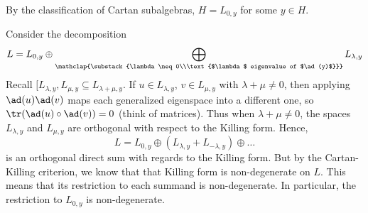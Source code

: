 By the classification of Cartan subalgebras, $H = L_{0, y}$ for some
$y \in H$.

Consider the decomposition
\[ L = L_{0, y} \oplus \bigoplus_{\mathclap{\substack{\lambda\neq 0\\\text{$\lambda$ eigenvalue of $\ad(y)$}}}} L_{\lambda, y} \]
Recall $[L_{\lambda, y}, L_{\mu, y} \subseteq L_{\lambda+\mu, y}$.
If $u \in L_{\lambda, y}$, $v \in L_{\mu, y}$ with $\lambda + \mu \neq 0$, then
applying $\ad(u)\ad(v)$ maps each generalized eigenspace into a different one, so
$\tr(\ad(u) \circ \ad(v)) = 0$ (think of matrices). Thus when
$\lambda + \mu \neq 0$, the spaces $L_{\lambda, y}$ and $L_{\mu, y}$ are
orthogonal with respect to the Killing form. Hence,
\[ L = L_{0, y} \oplus (L_{\lambda, y} + L_{-\lambda, y}) \oplus \ldots \]
is an orthogonal direct sum with regards to the Killing form. But by
the Cartan-Killing criterion, we know that that Killing form is non-degenerate
on $L$. This means that its restriction to each summand is non-degenerate. In
particular, the restriction to $L_{0, y}$ is non-degenerate.
